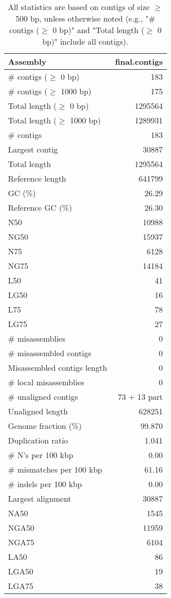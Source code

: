\documentclass[12pt,a4paper]{article}
\begin{document}
\begin{table}[ht]
\begin{center}
\caption{All statistics are based on contigs of size $\geq$ 500 bp, unless otherwise noted (e.g., "\# contigs ($\geq$ 0 bp)" and "Total length ($\geq$ 0 bp)" include all contigs).}
\begin{tabular}{|l*{1}{|r}|}
\hline
Assembly & final.contigs \\ \hline
\# contigs ($\geq$ 0 bp) & 183 \\ \hline
\# contigs ($\geq$ 1000 bp) & 175 \\ \hline
Total length ($\geq$ 0 bp) & 1295564 \\ \hline
Total length ($\geq$ 1000 bp) & 1289931 \\ \hline
\# contigs & 183 \\ \hline
Largest contig & 30887 \\ \hline
Total length & 1295564 \\ \hline
Reference length & 641799 \\ \hline
GC (\%) & 26.29 \\ \hline
Reference GC (\%) & 26.30 \\ \hline
N50 & 10988 \\ \hline
NG50 & 15937 \\ \hline
N75 & 6128 \\ \hline
NG75 & 14184 \\ \hline
L50 & 41 \\ \hline
LG50 & 16 \\ \hline
L75 & 78 \\ \hline
LG75 & 27 \\ \hline
\# misassemblies & 0 \\ \hline
\# misassembled contigs & 0 \\ \hline
Misassembled contigs length & 0 \\ \hline
\# local misassemblies & 0 \\ \hline
\# unaligned contigs & 73 + 13 part \\ \hline
Unaligned length & 628251 \\ \hline
Genome fraction (\%) & 99.870 \\ \hline
Duplication ratio & 1.041 \\ \hline
\# N's per 100 kbp & 0.00 \\ \hline
\# mismatches per 100 kbp & 61.16 \\ \hline
\# indels per 100 kbp & 0.00 \\ \hline
Largest alignment & 30887 \\ \hline
NA50 & 1545 \\ \hline
NGA50 & 11959 \\ \hline
NGA75 & 6104 \\ \hline
LA50 & 86 \\ \hline
LGA50 & 19 \\ \hline
LGA75 & 38 \\ \hline
\end{tabular}
\end{center}
\end{table}
\end{document}
